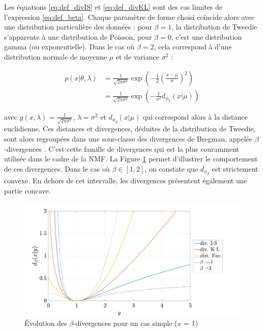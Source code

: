 Les équations \ref{eq:def_divIS} et \ref{eq:def_divKL} sont des cas limites de l'expression \ref{eq:def_beta}. Chaque paramètre de forme choisi coïncide alors avec une distribution particulière des données : pour $\beta = 1$, la distribution de Tweedie s'apparente à une distribution de Poisson, pour $\beta = 0$, c'est une distribution gamma (ou exponentielle). Dans le cas où $\beta = 2$, cela correspond à d'une distribution normale de moyenne $\mu$ et de variance $\sigma^2$ :

\begin{align}
p(x \vert \theta, \lambda) & = \frac{1}{\sqrt{2 \pi \sigma^2}}\exp\left(-\frac{1}{2} \left(\frac{x-\mu}{\sigma} \right)^2 \right)\\
& = \frac{1}{\sqrt{2 \pi \sigma^2}}\exp\left(-\frac{1}{\sigma^2}  d_{\phi_{2}}(x\vert \mu) \right)
\end{align}

avec $g(x,\lambda) = \frac{1}{\sqrt{2 \pi \sigma^2}}$, $\lambda = \sigma^2$ et $d_{\phi_{2}}(x\vert \mu)$ qui correspond alors à la distance euclidienne. Ces distances et divergences, déduites de la distribution de Tweedie, sont alors regroupées dans une sous-classe des divergences de Bregman, appelée $\beta$-divergences \cite{hennequin_beta-divergence_2011}. C'est cette famille de divergences qui est la plus couramment utilisée dans le cadre de la NMF. La Figure \ref{fig:allure-divergence} permet d'illustrer le comportement de ces divergences. Dans le cas où $\beta \in \left[ 1,2 \right]$, on constate que $d_{\phi_{\beta}}$ est strictement convexe. En dehors de cet intervalle, les divergences présentent également une partie concave. \\

\begin{figure}[h]
\centering
\includegraphics[width=.7\textwidth]{./figures/NMF/betaDiv_exemple.pdf}
\caption{Évolution des $\beta$-divergences pour un cas simple ($x$ = 1)}
\label{fig:allure-divergence}
\end{figure}


